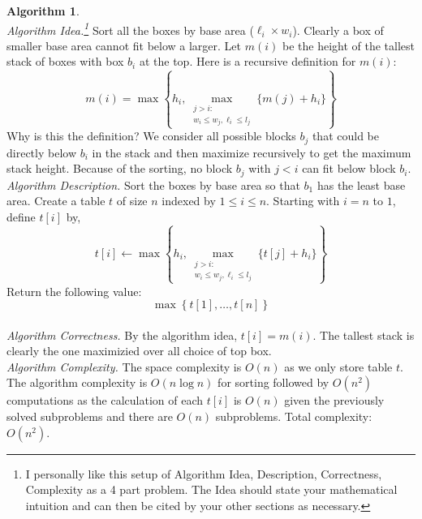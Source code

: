 \documentclass[10pt]{article}
\theoremstyle{plain}
\theoremstyle{definition}
\newtheorem{alg}[thm]{Algorithm}
\numberwithin{equation}{section}
\numberwithin{figure}{section}
\begin{document}
\begin{alg} \ \\
\noindent \textit{Algorithm Idea.\footnote{I personally like this setup of Algorithm Idea, Description, Correctness, Complexity as a 4 part problem. The Idea should state your mathematical intuition and can then be cited by your other sections as necessary.}} Sort all the boxes by base area ($\ell_i \times w_i$). Clearly a box of smaller base area cannot fit below a larger. Let $m(i)$ be the height of the tallest stack of boxes with box $b_i$ at the top. Here is a recursive definition for $m(i)$:
\begin{equation}
m(i) = \max \left\{ h_i, \max_{\substack{j > i : \\w_i \leq w_j, \ell_i \leq l_j }} \{ m(j) + h_i \} \right\}
\end{equation}
Why is this the definition? We consider all possible blocks $b_j$ that could be directly below $b_i$ in the stack and then maximize recursively to get the maximum stack height. Because of the sorting, no block $b_j$ with $j < i$ can fit below block $b_i$. \\

\noindent \textit{Algorithm Description.} Sort the boxes by base area so that $b_1$ has the least base area. Create a table $t$ of size $n$ indexed by $1 \leq i \leq n$. Starting with $i = n$ to $1$, define $t[i]$ by,
\begin{equation}
t[i] \leftarrow \max \left\{ h_i, \max_{\substack{j > i : \\w_i \leq w_j, \ell_i \leq l_j }} \{ t[j] + h_i \} \right\}
\end{equation}
Return the following value:
\begin{equation}
\max \left \{t[1], \ldots, t[n] \right\}
\end{equation} \\

\noindent \textit{Algorithm Correctness.} By the algorithm idea, $t[i] = m(i)$. The tallest stack is clearly the one maximizied over all choice of top box. \\

\noindent \textit{Algorithm Complexity.} The space complexity is $O(n)$ as we only store table $t$. The algorithm complexity is $O(n \log n)$ for sorting followed by $O(n^2)$ computations as the calculation of each $t[i]$ is $O(n)$ given the previously solved subproblems and there are $O(n)$ subproblems. Total complexity: $O(n^2)$.
\end{alg}
\end{document}
